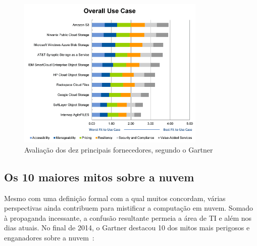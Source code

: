 \begin{figure}[ht]
    \centering
    \includegraphics[width=0.8\textwidth]{img/top10.png}
    \caption{Avaliação dos dez principais fornecedores, segundo o
        Gartner~\cite{gartner-top-10}
    }
    \label{fig:gartner-top10}
\end{figure}


\subsection{Os 10 maiores mitos sobre a nuvem}

Mesmo com uma definição formal com a qual muitos concordam, várias perspectivas 
ainda contribuem para mistificar a computação em nuvem. Somado à propaganda 
incessante, a confusão resultante permeia a área de TI e além nos dias atuais. No 
final de 2014, o Gartner destacou 10 dos mitos mais perigosos e enganadores sobre a 
nuvem~\cite{gartner-10-myths-cloud}:
    
\newcommand{\itemm}[1]{\item\textbf{#1}\newline}    

